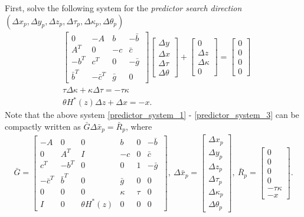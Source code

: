 \documentclass[11pt]{article}
\theoremstyle{definition}
\theoremstyle{plain}
\begin{document}
First, solve the following system for the \textit{predictor search direction} $(\Delta x_p, \Delta y_p, \Delta z_p, \Delta \tau_p, \Delta \kappa_p, \Delta \theta_p)$
\begin{align}
& \begin{bmatrix}
0 & -A & b & -\bar b\ \\ 
A^T & 0 & -c & \bar c \\
-b^T & c^T& 0 & -\bar g \\
\bar b^T & -\bar c^T & \bar g & 0
\end{bmatrix}
\begin{bmatrix}
\Delta y \\ \Delta x \\ \Delta \tau \\ \Delta \theta
\end{bmatrix} + 
\begin{bmatrix}
0 \\ \Delta z \\ \Delta \kappa \\ 0 
\end{bmatrix} = \begin{bmatrix}
0 \\0\\0\\0
\end{bmatrix} \label{predictor_system_1} \\[1ex]
& \tau \Delta \kappa + \kappa \Delta \tau = - \tau \kappa \label{predictor_system_2} \\[1ex]
& \theta H^*(z)\Delta z + \Delta x = -x. \label{predictor_system_3}
\end{align}
Note that the above system \eqref{predictor_system_1} - \eqref{predictor_system_3} can be compactly written as $\bar G \Delta \bar x_p = \bar R_p$, where
\begin{align}
\bar G = \begin{bmatrix}
-A & 0 & 0 & b & 0 & -\bar b\ \\
0 & A^T & I & -c & 0 & \bar c \\
c^T & -b^T & 0 & 0 & 1 & -\bar g \\
-\bar c^T & \bar b^T & 0 & \bar g & 0 & 0 \\
0 & 0 & 0 & \kappa & \tau & 0 \\
I & 0 & \theta H^*(z) & 0 & 0 & 0
\end{bmatrix},\ \Delta \bar{x}_p = \begin{bmatrix}
\Delta{x}_p\\ \Delta{y}_p\\ \Delta{z}_p\\ \Delta{\tau}_p\\ \Delta{\kappa}_p\\ \Delta{\theta}_p
\end{bmatrix},\ \bar R_p= \begin{bmatrix}
0 \\ 0 \\ 0 \\ 0 \\-\tau\kappa \\ -x
\end{bmatrix}. \label{G_bar_etc_predictor_system_def}
\end{align} 
\end{document}
